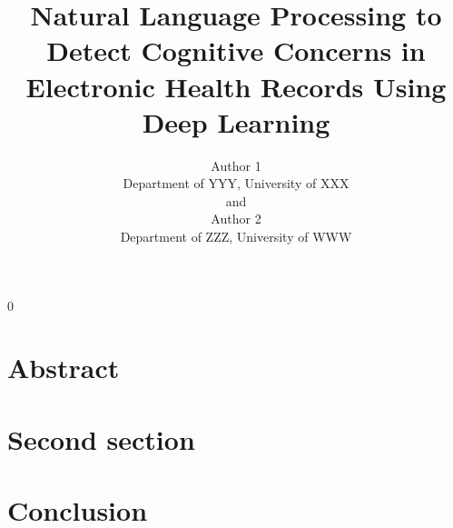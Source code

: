 \documentclass[12pt]{article}
\newcommand{\blind}{0}
\begin{document}
\blind {
    \title {
        \bf Natural Language Processing to Detect Cognitive Concerns in Electronic Health Records Using Deep Learning
    }
    
    \author {
        Author 1 \\
        Department of YYY, University of XXX\\
        and \\
        Author 2 \\
        Department of ZZZ, University of WWW
    }
    
    \maketitle
} \fi

\newpage
    \tableofcontents
\newpage

\section{Abstract}



\section{Second section}




\section{Conclusion}

\label{sec:conc}
\end{document}
